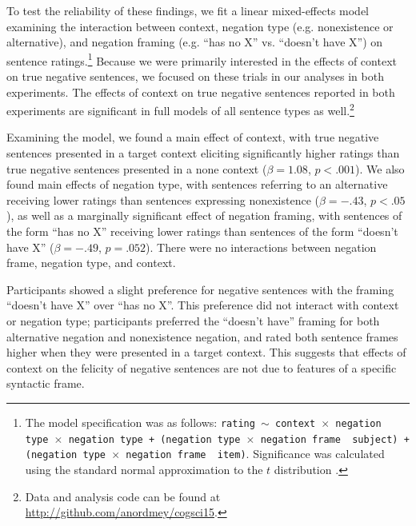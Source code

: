 \documentclass[10pt,letterpaper]{article}
\begin{document}

 
To test the reliability of these findings, we fit a linear mixed-effects model examining the interaction between context, negation type (e.g. nonexistence or alternative), and negation framing (e.g. ``has no X'' vs. ``doesn't have X'') on sentence ratings.\footnote{ The model specification was as follows: \texttt{rating $\sim$ context~$\times$~negation type~$\times$~negation type + (negation type~$\times$~negation frame~\textbar~subject) +  (negation type~$\times$~negation frame~\textbar~item)}.  Significance was calculated using the standard normal approximation to the $t$ distribution \cite{barr2013}.} Because we were primarily interested in the effects of context on true negative sentences, we focused on these trials in our analyses in both experiments.  The effects of context on true negative sentences reported in both experiments are significant in full models of all sentence types as well.\footnote{Data and analysis code can be found at \href{http://github.com/anordmey/cogsci15}{http://github.com/anordmey/cogsci15}.}

Examining the model, we found a main effect of context, with true negative sentences presented in a target context eliciting significantly higher ratings than true negative sentences presented in a none context ($\beta= 1.08$, $p< .001$).  We also found main effects of negation type, with sentences referring to an alternative receiving lower ratings than sentences expressing nonexistence ($\beta= -.43$, $p< .05$), as well as a marginally significant effect of negation framing, with sentences of the form ``has no X'' receiving lower ratings than sentences of the form ``doesn't have X''  ($\beta= -.49$, $p= .052$).  There were no interactions between negation frame, negation type, and context.  

Participants showed a slight preference for negative sentences with the framing ``doesn't have X'' over ``has no X''.  This preference did not interact with context or negation type; participants preferred the ``doesn't have'' framing for both alternative negation and nonexistence negation, and rated both sentence frames higher when they were presented in a target context.  This suggests that effects of context on the felicity of negative sentences are not due to features of a specific syntactic frame.
\end{document}
